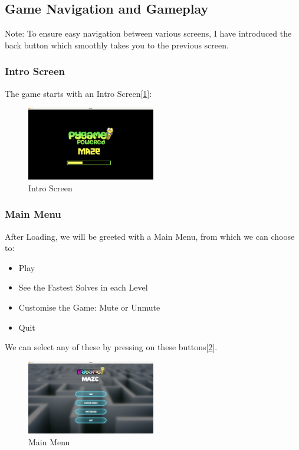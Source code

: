 \documentclass[10pt]{article}
\begin{document}
    \subsection{Game Navigation and Gameplay}\label{subsec:game-navigation}
    Note: To ensure easy navigation between various screens, I have introduced the back button which smoothly takes you to the previous screen.

    \subsubsection{Intro Screen}
    The game starts with an Intro Screen[\ref{fig:Intro}]:
    \begin{figure}[h!]
        \centering
        \includegraphics[width=0.5\textwidth]{Intro}
        \caption{Intro Screen}\label{fig:Intro}
    \end{figure}

    \subsubsection{Main Menu}
    After Loading, we will be greeted with a Main Menu, from which we can choose to:
    \begin{itemize}
        \item Play
        \item See the Fastest Solves in each Level
        \item Customise the Game: Mute or Unmute
        \item Quit
    \end{itemize}
    We can select any of these by pressing on these buttons[\ref{fig:MainMenu}].
    \begin{figure}[h!]
        \centering
        \includegraphics[width=0.5\textwidth]{MainMenu}
        \caption{Main Menu}\label{fig:MainMenu}
    \end{figure}
\end{document}
